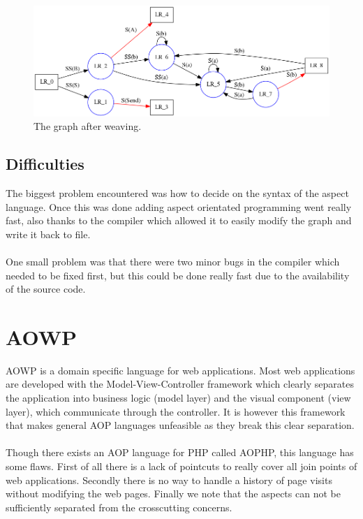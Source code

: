 \documentclass[a4paper]{report}
\begin{document}
\begin{figure}
\includegraphics[width=\textwidth]{images/AOFDot/ExampleAfter.png}
\caption{The graph after weaving.}
\end{figure}

\section{Difficulties}
The biggest problem encountered was how to decide on the syntax of the aspect language. Once this was done adding aspect orientated programming went really fast, also thanks to the compiler which allowed it to easily modify the graph and write it back to file.\\
\\
One small problem was that there were two minor bugs in the compiler which needed to be fixed first, but this could be done really fast due to the availability of the source code.

\chapter{AOWP}
AOWP \cite{hokamura_aspect-oriented_2008} is a domain specific language for web applications. Most web applications are developed with the Model-View-Controller framework which clearly separates the application into business logic (model layer) and the visual component (view layer), which communicate through the controller. It is however this framework that makes general AOP languages unfeasible as they break this clear separation.\\
\\
Though there exists an AOP language for PHP called AOPHP, this language has some flaws. First of all there is a lack of pointcuts to really cover all join points of web applications. Secondly there is no way to handle a history of page visits without modifying the web pages. Finally we note that the aspects can not be sufficiently separated from the crosscutting concerns.
\end{document}

